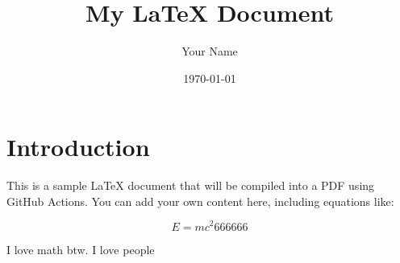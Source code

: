 \documentclass[a4paper,12pt]{article}
\begin{document}
\title{My LaTeX Document}
\author{Your Name}
\date{\today}
\maketitle

\section{Introduction}
This is a sample LaTeX document that will be compiled into a PDF using GitHub Actions. You can add your own content here, including equations like:

\begin{equation}
E = mc^2 666666
\end{equation}

I love math btw. I love people

\end{document}
